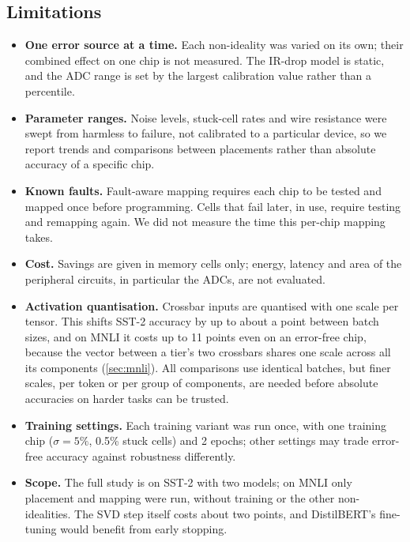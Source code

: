 \subsection{Limitations}
\begin{itemize}
\item \textbf{One error source at a time.} Each non-ideality was varied on its own; their combined effect
on one chip is not measured. The IR-drop model is static, and the ADC range is set by the largest
calibration value rather than a percentile.
\item \textbf{Parameter ranges.} Noise levels, stuck-cell rates and wire resistance were swept from
harmless to failure, not calibrated to a particular device, so we report trends and comparisons between
placements rather than absolute accuracy of a specific chip.
\item \textbf{Known faults.} Fault-aware mapping requires each chip to be tested and mapped once before
programming. Cells that fail later, in use, require testing and remapping again. We did not measure the
time this per-chip mapping takes.
\item \textbf{Cost.} Savings are given in memory cells only; energy, latency and area of the peripheral
circuits, in particular the ADCs, are not evaluated.
\item \textbf{Activation quantisation.} Crossbar inputs are quantised with one scale per tensor. This shifts
SST-2 accuracy by up to about a point between batch sizes, and on MNLI it costs up to 11 points even on an
error-free chip, because the vector between a tier's two crossbars shares one scale across all its
components (\cref{sec:mnli}). All comparisons use identical batches, but finer scales, per token or per
group of components, are needed before absolute accuracies on harder tasks can be trusted.
\item \textbf{Training settings.} Each training variant was run once, with one training chip ($\sigma=5\%$,
0.5\% stuck cells) and 2 epochs; other settings may trade error-free accuracy against robustness
differently.
\item \textbf{Scope.} The full study is on SST-2 with two models; on MNLI only placement and mapping were
run, without training or the other non-idealities. The SVD step itself costs about two points,
and DistilBERT's fine-tuning would benefit from early stopping.
\end{itemize}
